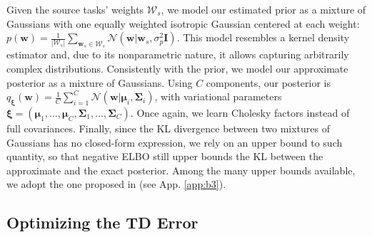 \documentclass{article}
\newcommand{\abs}[1]{\left\lvert #1 \right\rvert}
\begin{document}
Given the source tasks' weights $\mathcal{W}_s$, we model our estimated prior as a mixture of Gaussians with one equally weighted isotropic Gaussian centered at each weight: $p(\bm{w}) = \frac{1}{\abs{\mathcal{W}_s}}\sum_{\bm{w}_s \in \mathcal{W}_s}\mathcal{N}(\bm{w}|\bm{w}_s,\sigma_p^2\bm{I})$. This model resembles a kernel density estimator \cite{scott2015multivariate} and, due to its nonparametric nature, it allows capturing arbitrarily complex distributions. Consistently with the prior, we model our approximate posterior as a mixture of Gaussians.  Using $C$ components, our posterior is $q_{\bm{\xi}}(\bm{w}) = \frac{1}{C}\sum_{i=1}^C\mathcal{N}(\bm{w}|\bm{\mu}_i,\bm{\Sigma}_i)$, with variational parameters $\bm{\xi} = (\bm{\mu}_1,\dots,\bm{\mu}_C,\bm{\Sigma}_1,\dots,\bm{\Sigma}_C)$. Once again, we learn Cholesky factors instead of full covariances. Finally, since the KL divergence between two mixtures of Gaussians has no closed-form expression, we rely on an upper bound to such quantity, so that negative ELBO still upper bounds the KL between the approximate and the exact posterior. Among the many upper bounds available, we adopt the one proposed in \cite{hershey2007approximating} (see App. \ref{app:b3}).

\subsection{Optimizing the TD Error} \label{sec:td}
\end{document}
